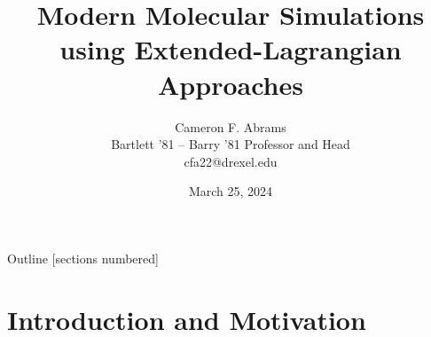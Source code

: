 \documentclass[10pt]{beamer}
\title{Modern Molecular Simulations using Extended-Lagrangian Approaches}
\date{March 25, 2024}
\author{Cameron F. Abrams\\Bartlett '81 -- Barry '81 Professor and Head\\cfa22@drexel.edu}
\institute{Drexel University, Department of Chemical and Biological Engineering}
\begin{document}
\maketitle

\begin{frame}{Outline}
  [sections numbered]
  \tableofcontents[hideallsubsections]
\end{frame}

\section{Introduction and Motivation}

% 

% 

% 


% 

% 


% 



% 

% 

% 

% 




% 
% 
% 
% 
\end{document}
